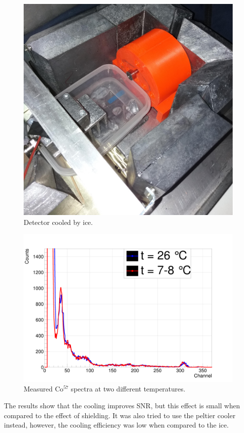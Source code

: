 \begin{figure}[H]
 \centering
 \includegraphics[scale=0.09, angle = 0]{./pictures/chlazeniLedem.jpg}
 \caption{Detector cooled by ice.}
 \label{cooler}
 
\end{figure}



\begin{figure}[H]
 \centering
 \includegraphics[scale=0.13, angle = 0]{./pictures/TempDiff.png}
 \caption{Measured Co$^{57}$ spectra at two different temperatures.}
 \label{coolspectr}
 
\end{figure}








\par
The results show that the cooling improves SNR, but this effect is small when compared to the effect of shielding. It was also tried to use the peltier cooler instead, however, the cooling efficiency was low when compared to the ice.
